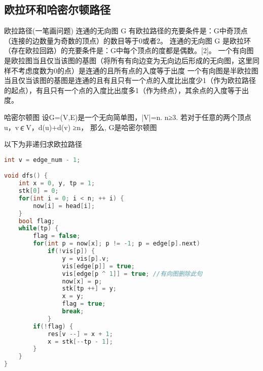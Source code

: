 \subsection{欧拉环和哈密尔顿路径}
    欧拉路径(一笔画问题)
    连通的无向图 G 有欧拉路径的充要条件是：G中奇顶点（连接的边数量为奇数的顶点）的数目等于0或者2。
    连通的无向图 G 是欧拉环（存在欧拉回路）的充要条件是：G中每个顶点的度都是偶数。[2]。
    一个有向图是欧拉图当且仅当该图的基图（将所有有向边变为无向边后形成的无向图，这里同样不考虑度数为0的点）是连通的且所有点的入度等于出度
    一个有向图是半欧拉图当且仅当该图的基图是连通的且有且只有一个点的入度比出度少1（作为欧拉路径的起点），有且只有一个点的入度比出度多1（作为终点），其余点的入度等于出度。

    哈密尔顿图 
    设G=(V,E)是一个无向简单图，|V|=n.  n≥3. 
    若对于任意的两个顶点u，v∊V，d(u)+d(v) ≥n，
    那么, G是哈密尔顿图
    
    以下为非递归求欧拉路径
    \begin{lstlisting}[language=c++]
int v = edge_num - 1;

void dfs() {
    int x = 0, y, tp = 1;
    stk[0] = 0;
    for(int i = 0; i < n; ++ i) {
        now[i] = head[i];
    }
    bool flag;
    while(tp) {
        flag = false;
        for(int p = now[x]; p != -1; p = edge[p].next)
            if(!vis[p]) {
                y = vis[p].v;
                vis[edge[p]] = true;
                vis[edge[p ^ 1]] = true; //有向图删除此句
                now[x] = p;
                stk[tp ++] = y;
                x = y;
                flag = true;
                break;
            }
        if(!flag) {
            res[v --] = x + 1;
            x = stk[--tp - 1];
        }
    }
}
    \end{lstlisting}
